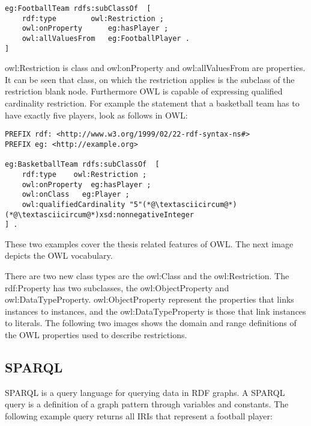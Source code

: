 \begin{lstlisting}[basicstyle=\footnotesize, captionpos=b, caption=OWL restriction in N3 format, label=lst:sparql,
frame=single]
eg:FootballTeam rdfs:subClassOf  [ 
	rdf:type		owl:Restriction ; 
	owl:onProperty		eg:hasPlayer ; 
	owl:allValuesFrom	eg:FootballPlayer .
]
\end{lstlisting}

owl:Restriction is class and owl:onProperty and owl:allValuesFrom are properties. It can be seen that class, on which the restriction applies is the subclass of the restriction blank node.
Furthermore OWL is capable of expressing qualified cardinality restriction. For example the statement that a basketball team has to have exactly five players, look as follows in OWL:


\begin{lstlisting}[captionpos=b, caption=OWL restriction in N3 format, label=lst:sparql,
basicstyle=\footnotesize,frame=single]
PREFIX rdf: <http://www.w3.org/1999/02/22-rdf-syntax-ns#>
PREFIX eg: <http://example.org> 

eg:BasketballTeam rdfs:subClassOf  [
	rdf:type	owl:Restriction ; 
	owl:onProperty	eg:hasPlayer ; 
	owl:onClass	  eg:Player ; 
	owl:qualifiedCardinality "5"(*@\textasciicircum@*)(*@\textasciicircum@*)xsd:nonnegativeInteger
] . 

\end{lstlisting}


These two examples cover the thesis related features of OWL. The next image depicts the OWL vocabulary. 



There are two new class types are the owl:Class and the owl:Restriction. The rdf:Property has two subclasses, the owl:ObjectProperty and owl:DataTypeProperty. owl:ObjectProperty represent the properties that links instances to instances, and the owl:DataTypeProperty is those that link instances to literals. The following two images shows the domain and range definitions of the OWL properties used to describe restrictions.


\subsection{SPARQL}

SPARQL is a query language for querying data in RDF graphs. A SPARQL query is a definition of a graph pattern through variables and constants. The following example query returns all IRIs that represent a football player: 

